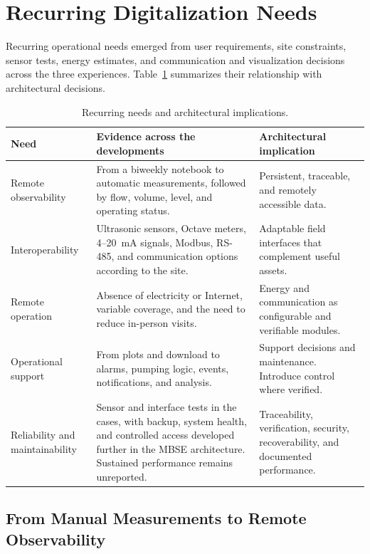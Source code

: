 \documentclass[conference]{IEEEtran}
\begin{document}
\section{Recurring Digitalization Needs}

Recurring operational needs emerged from user requirements, site constraints, sensor tests, energy estimates, and communication and visualization decisions across the three experiences. Table~\ref{tab:needs} summarizes their relationship with architectural decisions.

\begin{table}[t]
\caption{Recurring needs and architectural implications.}
\label{tab:needs}
\centering
\scriptsize
\renewcommand{\arraystretch}{1.13}
\begin{tabularx}{\textwidth}{@{}>{\raggedright\arraybackslash}p{}>{\raggedright\arraybackslash}X>{\raggedright\arraybackslash}p{}@{}}
\toprule
\textbf{Need} & \textbf{Evidence across the developments} & \textbf{Architectural implication} \\
\midrule
Remote observability & From a biweekly notebook to automatic measurements, followed by flow, volume, level, and operating status. & Persistent, traceable, and remotely accessible data. \\
Interoperability & Ultrasonic sensors, Octave meters, 4--20~mA signals, Modbus, RS-485, and communication options according to the site. & Adaptable field interfaces that complement useful assets. \\
Remote operation & Absence of electricity or Internet, variable coverage, and the need to reduce in-person visits. & Energy and communication as configurable and verifiable modules. \\
Operational support & From plots and download to alarms, pumping logic, events, notifications, and analysis. & Support decisions and maintenance. Introduce control where verified. \\
Reliability and maintainability & Sensor and interface tests in the cases, with backup, system health, and controlled access developed further in the MBSE architecture. Sustained performance remains unreported. & Traceability, verification, security, recoverability, and documented performance. \\
\bottomrule
\end{tabularx}
\end{table}

\subsection{From Manual Measurements to Remote Observability}
\end{document}
